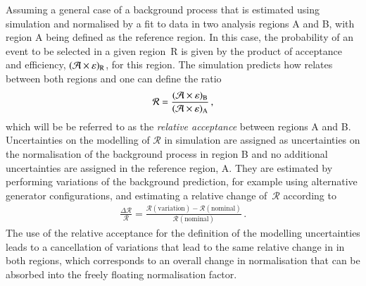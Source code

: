 Assuming a general case of a background process that is estimated
using simulation and normalised by a fit to data in two analysis
regions A and B, with region A being defined as the reference
region. In this case, the probability of an event to be selected in a
given region~R is given by the product of acceptance and efficiency,
$(\mathcal{A} \times \varepsilon)_{\text{R}}$, for this region. The simulation predicts
how \AccTimesEff relates between both regions and one can define the
ratio
\begin{align*}
  \mathcal{R} = \frac{(\mathcal{A} \times \varepsilon)_{\text{B}}}{(\mathcal{A} \times \varepsilon)_{\text{A}}} \,\text{,}
\end{align*}
which will be be referred to as the \emph{relative acceptance} between
regions A and B. Uncertainties on the modelling of $\mathcal{R}$ in
simulation are assigned as uncertainties on the normalisation of the
background process in region B and no
additional uncertainties are assigned in the reference region, A. They
are estimated by performing variations of the background prediction,
for example using alternative generator configurations, and estimating
a relative change of~$\mathcal{R}$ according to
\begin{align}
  \frac{\Delta \mathcal{R}}{\mathcal{R}} = \frac{\mathcal{R}(\text{variation}) - \mathcal{R}(\text{nominal})}{\mathcal{R}(\text{nominal})} \,\text{.}
  \label{eq:relative_acceptance_uncertainty}
\end{align}
The use of the relative acceptance for the definition of the modelling
uncertainties leads to a cancellation of variations that lead to the
same relative change in \AccTimesEff in both regions, which
corresponds to an overall change in normalisation that can be absorbed
into the freely floating normalisation factor.



